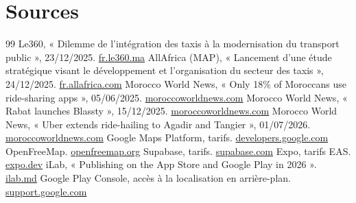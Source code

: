 \documentclass[11pt,a4paper]{article}
\begin{document}
\section*{Sources}
{\footnotesize
\renewcommand{\refname}{}\setlength{\itemsep}{0pt}
\vspace{-1.2cm}
\begin{thebibliography}{99}\setlength{\itemsep}{1pt}\setlength{\parskip}{0pt}
 Le360, « Dilemme de l'intégration des taxis à la modernisation du transport public », 23/12/2025. \href{https://fr.le360.ma/politique/dilemme-dintegration-des-taxis-a-la-modernisation-du-transport-public-ce-quen-dit-abdelouafi-laftit_SI5PIEJVSJHF7BRPXKKKSCKV6E/}{\textcolor{brand}{fr.le360.ma}}
 AllAfrica (MAP), « Lancement d'une étude stratégique visant le développement et l'organisation du secteur des taxis », 24/12/2025. \href{https://fr.allafrica.com/stories/202512240397.html}{\textcolor{brand}{fr.allafrica.com}}
 Morocco World News, « Only 18\% of Moroccans use ride-sharing apps », 05/06/2025. \href{https://www.moroccoworldnews.com/2025/06/208207/only-18-of-moroccans-use-ride-sharing-apps-despite-high-satisfaction/}{\textcolor{brand}{moroccoworldnews.com}}
 Morocco World News, « Rabat launches Blassty », 15/12/2025. \href{https://www.moroccoworldnews.com/2025/12/271965/rabat-launches-blassty-moroccos-first-all-in-one-urban-mobility-app/}{\textcolor{brand}{moroccoworldnews.com}}
 Morocco World News, « Uber extends ride-hailing to Agadir and Tangier », 01/07/2026. \href{https://www.moroccoworldnews.com/2026/07/326727/uber-extends-ride-hailing-to-agadir-and-tangier-reinforces-casablanca-and-rabat/}{\textcolor{brand}{moroccoworldnews.com}}
 Google Maps Platform, tarifs. \href{https://developers.google.com/maps/billing-and-pricing/pricing}{\textcolor{brand}{developers.google.com}}
 OpenFreeMap. \href{https://openfreemap.org}{\textcolor{brand}{openfreemap.org}}
 Supabase, tarifs. \href{https://supabase.com/pricing}{\textcolor{brand}{supabase.com}}
 Expo, tarifs EAS. \href{https://expo.dev/pricing}{\textcolor{brand}{expo.dev}}
 iLab, « Publishing on the App Store and Google Play in 2026 ». \href{https://ilab.md/en/articles/publishing-on-the-app-store-and-google-play-in-2026-timelines-costs-and-7-hidden-requirements-that-could-derail-your-launch}{\textcolor{brand}{ilab.md}}
 Google Play Console, accès à la localisation en arrière-plan. \href{https://support.google.com/googleplay/android-developer/answer/9799150}{\textcolor{brand}{support.google.com}}

\end{thebibliography}}
\end{document}
